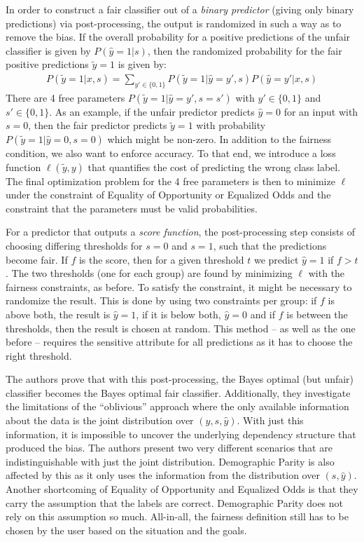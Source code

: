 In order to construct a fair classifier out of a \emph{binary predictor} (giving only binary
predictions) via post-processing, the output is randomized in such a way as to remove the
bias. If the overall probability for a positive predictions of the unfair classifier is
given by \(P(\hat{y}=1|s)\), then the randomized probability for the fair positive
predictions \(\tilde{y} = 1\) is given by:
\begin{align}
  \label{eq:hardt}
  P(\tilde{y}=1| x, s) = \sum\limits_{y' \in \{0, 1\}} P(\tilde{y} = 1| \hat{y}=y', s) 
  P(\hat{y}=y'| x, s)
\end{align}
There are 4 free parameters \(P(\tilde{y} = 1| \hat{y}=y', s=s')\) with \(y' \in \{0, 1\}\)
and \(s' \in \{0, 1\}\). As an example, if the unfair predictor predicts \(\hat{y} =0\) for an
input with \(s=0\), then the fair predictor predicts \(\tilde{y} =1\) with probability
\(P(\tilde{y} = 1| \hat{y}=0, s=0)\) which might be non-zero. In addition to the fairness
condition, we also want to enforce accuracy. To that end, we introduce a loss function
\(\ell (\tilde{y}, y)\) that quantifies the cost of predicting the wrong class label. The
final optimization problem for the 4 free parameters is then to minimize \(\ell\) under the
constraint of Equality of Opportunity or Equalized Odds and the constraint that the
parameters must be valid probabilities.

For a predictor that outputs a \emph{score function}, the post-processing step consists of
choosing differing thresholds for \(s=0\) and \(s=1\), such that the predictions become fair.
If \(f\) is the score, then for a given threshold \(t\) we predict \(\hat{y} = 1\) if \(f > t\).
The two thresholds (one for each group) are found by minimizing \(\ell\) with the fairness
constraints, as before. To satisfy the constraint, it might be necessary to randomize the
result. This is done by using two constraints per group: if \(f\) is above both, the result
is \(\hat{y} = 1\), if it is below both, \(\hat{y} =0\) and if \(f\) is between the thresholds,
then the result is chosen at random. This method -- as well as the one before -- requires
the sensitive attribute for all predictions as it has to choose the right threshold.

The authors prove that with this post-processing, the Bayes optimal (but unfair)
classifier becomes the Bayes optimal fair classifier. Additionally, they investigate the
limitations of the ``oblivious'' approach where the only available information about the
data is the joint distribution over \((y, s, \hat{y})\). With just this information, it is
impossible to uncover the underlying dependency structure that produced the bias. The
authors present two very different scenarios that are indistinguishable with just the
joint distribution. Demographic Parity is also affected by this as it only uses the
information from the distribution over \((s, \hat{y})\). Another shortcoming of Equality of
Opportunity and Equalized Odds is that they carry the assumption that the labels are
correct. Demographic Parity does not rely on this assumption so much. All-in-all, the
fairness definition still has to be chosen by the user based on the situation and the
goals.


